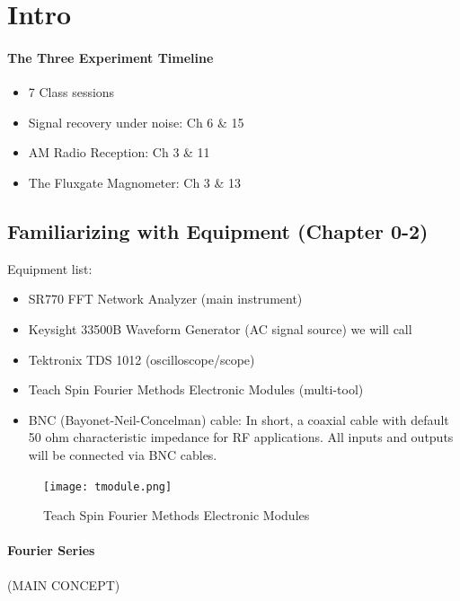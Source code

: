 \documentclass[../main.tex]{subfiles}
\begin{document}
\pagestyle{fancy}

\section*{Intro}


\paragraph*{The Three Experiment Timeline}
\begin{itemize}
    \item 7 Class sessions
    \item Signal recovery under noise: Ch 6 \& 15
    \item AM Radio Reception: Ch 3 \& 11
    \item The Fluxgate Magnometer: Ch 3 \& 13
\end{itemize}

\subsection{Familiarizing with Equipment (Chapter 0-2)}

Equipment list:
\begin{itemize}
    \item SR770 FFT Network Analyzer (main instrument)
    \item Keysight 33500B Waveform Generator (AC signal source) we will call 
    \item Tektronix TDS 1012 (oscilloscope/scope)
    \item Teach Spin Fourier Methods Electronic Modules (multi-tool)
    \item BNC (Bayonet-Neil-Concelman) cable: In short, a coaxial cable with default 50 ohm characteristic impedance for RF applications.
    All inputs and outputs will be connected via BNC cables.
\end{itemize}

\begin{figure}[ht]
    \centering
    \texttt{[image: tmodule.png]}
    \caption{Teach Spin Fourier Methods Electronic Modules}
\end{figure}

\paragraph*{Fourier Series} (MAIN CONCEPT)
\end{document}
